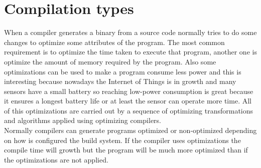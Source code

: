 \section{Compilation types}\label{S:PERF-comptypes}
When a compiler generates a binary from a source code normally tries to do some changes to optimize some attributes of the program. The most common requirement is to optimize the time taken to execute that program, another one is optimize the amount of memory required by the program. Also some optimizations can be used to make a program consume less power and this is interesting because nowadays the Internet of Things is in growth and many sensors have a small battery so reaching low-power consumption is great because it ensures a longest battery life or at least the sensor can operate more time. All of this optimizations are carried out by a sequence of optimizing transformations and algorithms applied using optimizing compilers.
\\
Normally compilers can generate programs optimized or non-optimized depending on how is configured the build system. If the compiler uses optimizations the compile time will growth but the program will be much more optimized than if the optimizations are not applied.

